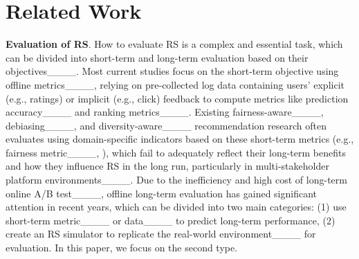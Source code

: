 \section{Related Work}
\textbf{Evaluation of RS}. How to evaluate RS is a complex and essential task, which can be divided into short-term and long-term evaluation based on their objectives____. Most current studies focus on the short-term objective using offline metrics____, relying on pre-collected log data containing users' explicit (e.g., ratings) or implicit (e.g., click) feedback to compute metrics like prediction accuracy____ and ranking metrics____. 
Existing fairness-aware____, debiasing____, and diversity-aware____ recommendation research often evaluates using domain-specific indicators based on these short-term metrics (e.g., fairness metric____, ), which fail to adequately reflect their long-term benefits and how they influence RS in the long run, particularly in multi-stakeholder platform environments____.
Due to the inefficiency and high cost of long-term online A/B test____, offline long-term evaluation has gained significant attention in recent years, which can be divided into two main categories: (1) use short-term metric____ or data____ to predict long-term performance, (2) create an RS simulator to replicate the real-world environment____ for evaluation.
In this paper, we focus on the second type. 

